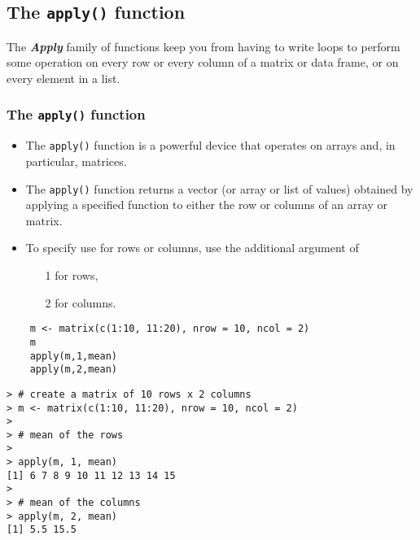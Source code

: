 \documentclass[]{article}
\begin{document}
\subsection*{The \texttt{apply()} function}
The \textbf{\textit{Apply}} family of functions keep you from having to write loops to perform some operation on every row or every column of a matrix or data frame, or on every element in a list.
\subsubsection*{The \texttt{apply()} function}
\begin{itemize}
	\item  The \texttt{apply()} function is a powerful device that operates on arrays and, in particular, matrices.
	
	\item The  \texttt{apply()} function returns a vector (or array or list of values) obtained by applying a specified function to either the row or columns of an array or matrix.
	\item 
	To specify use for rows or columns, use the additional argument of \begin{itemize}
		\item[1] for rows, \item[2] for columns.
	\end{itemize}
\end{itemize}
\begin{framed}
	\begin{verbatim}
	m <- matrix(c(1:10, 11:20), nrow = 10, ncol = 2)
	m
	apply(m,1,mean)
	apply(m,2,mean)
	\end{verbatim}
\end{framed}
\newpage
\begin{verbatim}
> # create a matrix of 10 rows x 2 columns
> m <- matrix(c(1:10, 11:20), nrow = 10, ncol = 2)
>
> # mean of the rows
>
> apply(m, 1, mean)
[1] 6 7 8 9 10 11 12 13 14 15
>
> # mean of the columns
> apply(m, 2, mean)
[1] 5.5 15.5
\end{verbatim}
\newpage
\end{document}
